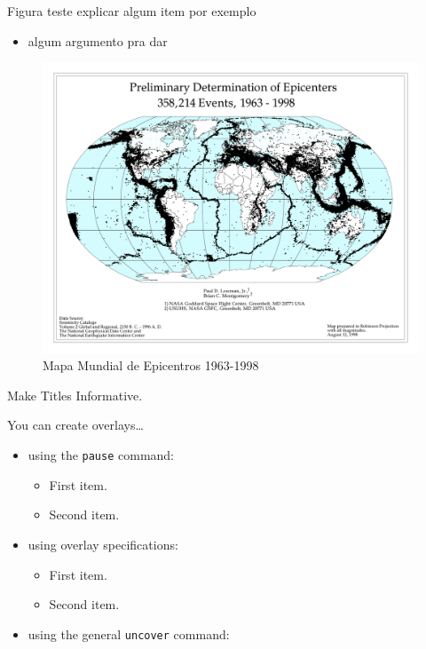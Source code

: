 \documentclass[ucs,8pt]{beamer}
\begin{document}
%
\begin{frame}{Figura teste}
explicar algum item por exemplo
\begin{itemize}
	\item algum argumento pra dar
\end{itemize}

\begin{figure}[H]
   \centering
   \includegraphics[height=0.70\textheight]{images/global_pde_mag_all}
   \caption[Mapa Mundial de Epicentros 1963-1998]
   		   {Mapa Mundial de Epicentros 1963-1998 \citet{lowman_jr_1998} } 
   \label{f:global_epicenters}
\end{figure}
\end{frame}



\begin{frame}{Make Titles Informative.}

  You can create overlays\dots
  \begin{itemize}
  \item using the \texttt{pause} command:
    \begin{itemize}
    \item
      First item.
      \pause
    \item    
      Second item.
    \end{itemize}
  \item
    using overlay specifications:
    \begin{itemize}
    \item<3->
      First item.
    \item<4->
      Second item.
    \end{itemize}
  \item
    using the general \texttt{uncover} command:
    \begin{itemize}
    \end{itemize}
  \end{itemize}
\end{frame}
\end{document}
